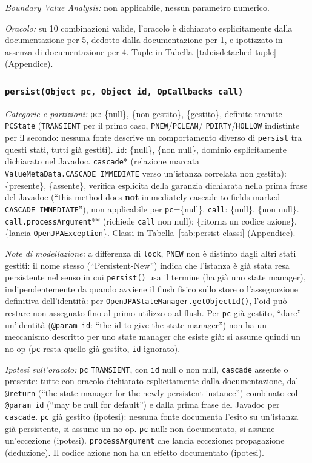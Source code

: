\textit{Boundary Value Analysis:} non applicabile, nessun parametro numerico.

\textit{Oracolo:} su 10 combinazioni valide, l'oracolo è dichiarato esplicitamente dalla
documentazione per 5, dedotto dalla documentazione per 1, e ipotizzato in assenza di
documentazione per 4. Tuple in Tabella~\ref{tab:isdetached-tuple} (Appendice).

\subsubsection{\texttt{persist(Object pc, Object id, OpCallbacks call)}}

\textit{Categorie e partizioni:} \texttt{pc}: \{null\}, \{non gestito\}, \{gestito\}, definite
tramite \texttt{PCState} (\texttt{TRANSIENT} per il primo caso, \texttt{PNEW}/\texttt{PCLEAN}/
\texttt{PDIRTY}/\texttt{HOLLOW} indistinte per il secondo: nessuna fonte descrive un
comportamento diverso di \texttt{persist} tra questi stati, tutti già gestiti). \texttt{id}:
\{null\}, \{non null\}, dominio esplicitamente dichiarato nel Javadoc. \texttt{cascade}*
(relazione marcata \texttt{ValueMetaData.CASCADE\_IMMEDIATE} verso un'istanza correlata non
gestita): \{presente\}, \{assente\}, verifica esplicita della garanzia dichiarata nella prima
frase del Javadoc (``this method does \textbf{not} immediately cascade to fields marked
\texttt{CASCADE\_IMMEDIATE}''), non applicabile per \texttt{pc}=\{null\}. \texttt{call}:
\{null\}, \{non null\}. \texttt{call.processArgument}** (richiede \texttt{call} non null):
\{ritorna un codice azione\}, \{lancia \texttt{OpenJPAException}\}. Classi in
Tabella~\ref{tab:persist-classi} (Appendice).

\textit{Note di modellazione:} a differenza di \texttt{lock}, \texttt{PNEW} non è distinto dagli
altri stati gestiti: il nome stesso (``Persistent-New'') indica che l'istanza è già stata resa
persistente nel senso in cui \texttt{persist()} usa il termine (ha già uno state manager),
indipendentemente da quando avviene il flush fisico sullo store o l'assegnazione definitiva
dell'identità: per \texttt{OpenJPAStateManager.getObjectId()}, l'oid può restare non assegnato
fino al primo utilizzo o al flush. Per \texttt{pc} già gestito, ``dare'' un'identità
(\texttt{@param id}: ``the id to give the state manager'') non ha un meccanismo descritto per
uno state manager che esiste già: si assume quindi un no-op (\texttt{pc} resta quello già
gestito, \texttt{id} ignorato).

\textit{Ipotesi sull'oracolo:} \texttt{pc} \texttt{TRANSIENT}, con \texttt{id} null o non null,
\texttt{cascade} assente o presente: tutte con oracolo dichiarato esplicitamente dalla
documentazione, dal \texttt{@return} (``the state manager
for the newly persistent instance'') combinato col \texttt{@param id} (``may be null for
default'') e dalla prima frase del Javadoc per \texttt{cascade}. \texttt{pc} già gestito
(ipotesi): nessuna fonte documenta l'esito su un'istanza già persistente, si assume un no-op.
\texttt{pc} null: non documentato, si assume un'eccezione (ipotesi).
\texttt{processArgument} che lancia eccezione: propagazione (deduzione). Il codice azione non ha
un effetto documentato (ipotesi).

